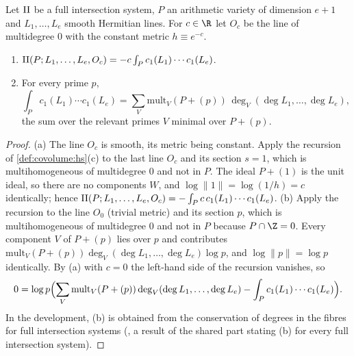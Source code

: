 \begin{lemma}\label{lem:pf:deepstr:constmetric}
Let $\mathrm{II}$ be a full intersection system, $P$ an arithmetic variety of dimension $e+1$ and $L_1,\dots,L_e$ smooth
Hermitian lines. For $c\in\R$ let $O_c$ be the line of multidegree $0$ with the constant metric $h\equiv e^{-c}$.
\begin{enumerate}[label=(\alph*)]
\item $\mathrm{II}(P;L_1,\dots,L_e,O_c)=-c\int_Pc_1(L_1)\cdots c_1(L_e)$.
\item For every prime $p$,
\[
\int_Pc_1(L_1)\cdots c_1(L_e)=\sum_V\mathrm{mult}_V(P+(p))\,\deg_V(\deg L_1,\dots,\deg L_e),
\]
the sum over the relevant primes $V$ minimal over $P+(p)$.
\end{enumerate}
\end{lemma}

\begin{proof}
(a) The line $O_c$ is smooth, its metric being constant. Apply the recursion of \cref{def:covolume:hs}(c) to the
last line $O_c$ and its section $s=1$, which is multihomogeneous of multidegree $0$ and not in $P$. The ideal $P+(1)$
is the unit ideal, so there are no components $W$, and $\log\|1\|=\log(1/h)=c$ identically; hence
$\mathrm{II}(P;L_1,\dots,L_e,O_c)=-\int_Pc\,c_1(L_1)\cdots c_1(L_e)$.
(b) Apply the recursion to the line $O_0$ (trivial metric) and its section $p$, which is multihomogeneous of
multidegree $0$ and not in $P$ because $P\cap\Z=0$. Every component $V$ of $P+(p)$ lies over $p$ and contributes
$\mathrm{mult}_V(P+(p))\deg_V(\deg L_1,\dots,\deg L_e)\log p$, and $\log\|p\|=\log p$ identically. By (a) with $c=0$ the
left-hand side of the recursion vanishes, so
\[
0=\log p\Bigl(\sum_V\mathrm{mult}_V(P+(p))\deg_V(\deg L_1,\dots,\deg L_e)-\int_Pc_1(L_1)\cdots c_1(L_e)\Bigr).
\]
In the development, (b) is obtained from the conservation of degrees in the fibres for full intersection systems
(, a result of the shared part
stating (b) for every full intersection system).
\end{proof}

